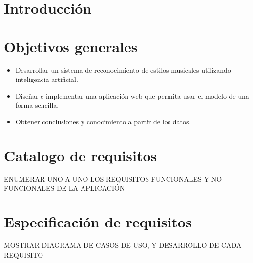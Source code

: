 
\section{Introducción}

\section{Objetivos generales}

\begin{itemize}
\tightlist
\item Desarrollar un sistema de reconocimiento de estilos musicales utilizando inteligencia artificial.
\item Diseñar e implementar una aplicación web que permita usar el modelo de una forma sencilla.
\item Obtener conclusiones y conocimiento a partir de los datos.
\end{itemize}

\section{Catalogo de requisitos}

ENUMERAR UNO A UNO LOS REQUISITOS FUNCIONALES Y NO FUNCIONALES DE LA APLICACIÓN

\section{Especificación de requisitos}

MOSTRAR DIAGRAMA DE CASOS DE USO, Y DESARROLLO DE CADA REQUISITO

